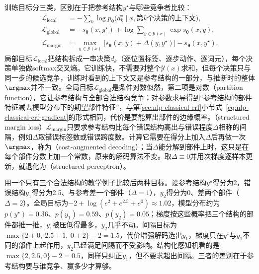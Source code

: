 训练目标分三类，区别在于把参考结构$y^\star$与哪些竞争者比较：
\begin{equation}
  \begin{aligned}
    \mathcal L_{\mathrm{local}}&=-\sum_{k}\log p_{\bm\theta}\bigl(d_k^\star\mid x,\text{第}k\text{个决策的上下文}\bigr),\\
    \mathcal L_{\mathrm{global}}&=-s_{\bm\theta}(x,y^\star)+\log\sum_{y\in\mathcal Y(x)}\exp s_{\bm\theta}(x,y),\\
    \mathcal L_{\mathrm{margin}}&=\max_{y\in\mathcal Y(x)}\bigl[s_{\bm\theta}(x,y)+\Delta(y,y^\star)\bigr]-s_{\bm\theta}(x,y^\star).
  \end{aligned}
  \label{eq:nlp-analysis-structured-objectives}
\end{equation}
局部目标$\mathcal L_{\mathrm{local}}$把结构拆成一串决策$d_k$（逐位置标签、逐步动作、逐词元），每个决策单独做softmax交叉熵。它训练快，不需要对整个$\mathcal Y(x)$求和，但每个决策只与同一步的候选竞争，训练时看到的上下文又是参考结构的一部分，与推断时的整体$\argmax$并不一致。全局目标$\mathcal L_{\mathrm{global}}$是条件对数似然，第二项是对数（partition function），它让参考结构与全部合法结构竞争；对参数求导得到“参考结构的部件特征减去模型分布下的期望部件特征”，与第\ref{sec:nlp-classical-crf}小节式~\eqref{eq:nlp-classical-crf-gradient}的形式相同，代价是要能算出部件的边缘概率。（structured margin loss）$\mathcal L_{\mathrm{margin}}$只要求参考结构比每个错误结构高出与错误程度$\Delta$相称的间隔，例如$\Delta$取错误标签数或错误跨度数。计算它需要在得分上加入$\Delta$后再做一次$\argmax$，称为（cost-augmented decoding）；当$\Delta$能分解到部件上时，这只是在每个部件分数上加一个常数，原来的解码算法不变。取$\Delta\equiv0$并用次梯度逐样本更新，就退化为（structured perceptron）。

用一个只有三个合法结构的教学例子比较后两种目标。设参考结构$y^\star$得分为2，错误结构$y_1$得分为2.5、与参考差一个部件（$\Delta=1$），$y_2$得分为0、差两个部件（$\Delta=2$）。全局目标为$-2+\log(e^{2}+e^{2.5}+e^{0})\approx1.02$，模型分布约为$p(y^\star)=0.36$、$p(y_1)=0.59$、$p(y_2)=0.05$；梯度按这些概率把三个结构的部件都推一推，$y_1$被压低得最多，$y_2$几乎不动。间隔目标为$\max\{2+0,\ 2.5+1,\ 0+2\}-2=1.5$，代价增强解码选出$y_1$，梯度只在$y^\star$与$y_1$不同的部件上起作用，$y_2$已经满足间隔而不受影响。结构化感知机看的是$\max\{2,2.5,0\}-2=0.5$，同样只纠正$y_1$，但不要求超出间隔。三者的差别在于参考结构要与谁竞争、赢多少才算够。

